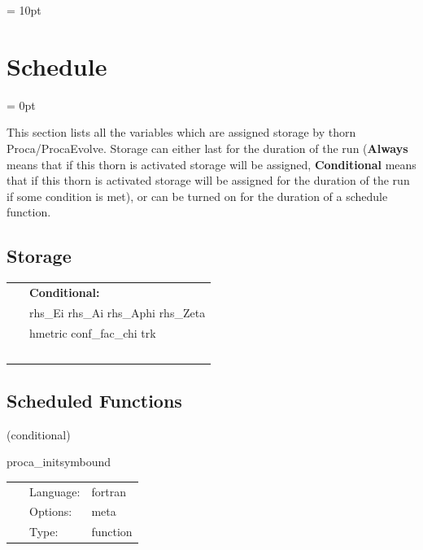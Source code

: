 \vspace{5mm}\parskip = 10pt 

\section{Schedule} 


\parskip = 0pt


\noindent This section lists all the variables which are assigned storage by thorn Proca/ProcaEvolve.  Storage can either last for the duration of the run ({\bf Always} means that if this thorn is activated storage will be assigned, {\bf Conditional} means that if this thorn is activated storage will be assigned for the duration of the run if some condition is met), or can be turned on for the duration of a schedule function.


\subsection*{Storage}

\hspace{5mm}

 \begin{tabular*}{160mm}{ll} 
~& {\bf Conditional:} \\ 
~ &  rhs\_Ei rhs\_Ai rhs\_Aphi rhs\_Zeta\\ 
~ &  hmetric conf\_fac\_chi trk\\ 
~ & ~\\ 
\end{tabular*} 


\subsection*{Scheduled Functions}
\vspace{5mm}

   (conditional) 

\hspace{5mm} proca\_initsymbound 

\hspace{5mm}{\it schedule symmetries } 


\hspace{5mm}

 \begin{tabular*}{160mm}{cll} 
~ & Language:  & fortran \\ 
~ & Options:  & meta \\ 
~ & Type:  & function \\ 
\end{tabular*} 


